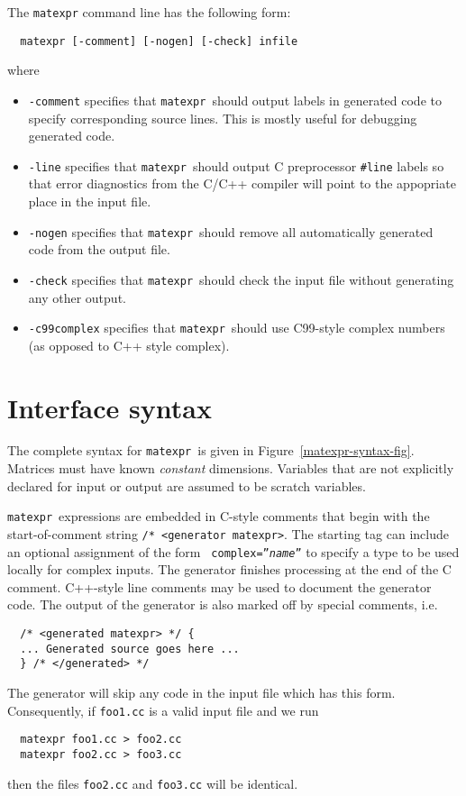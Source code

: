 \documentclass[12pt]{article}
\newcommand{\matexpr}{\texttt{matexpr}}
\begin{document}
The {\tt matexpr} command line has the following form:
\begin{verbatim}
  matexpr [-comment] [-nogen] [-check] infile
\end{verbatim}
where
\begin{itemize}

\item {\tt -comment} specifies that \matexpr\ should output
  labels in generated code to specify corresponding source lines.
  This is mostly useful for debugging generated code.

\item {\tt -line} specifies that \matexpr\ should output C preprocessor
  \verb|#line| labels so that error diagnostics from the C/C++ compiler
  will point to the appopriate place in the input file.

\item {\tt -nogen} specifies that \matexpr\ should remove all
  automatically generated code from the output file.

\item {\tt -check} specifies that \matexpr\ should check the
  input file without generating any other output.

\item {\tt -c99complex} specifies that \matexpr\ should use C99-style
  complex numbers (as opposed to C++ style complex).

\end{itemize}


\section{Interface syntax}

The complete syntax for \matexpr\ is given in Figure~\ref{matexpr-syntax-fig}. 
Matrices must have known {\em constant} dimensions.  Variables that are
not explicitly declared for input or output are assumed to be scratch
variables.

\matexpr\ expressions are embedded in C-style comments that begin with
the start-of-comment string {\tt /* <generator matexpr>}.  The
starting tag can include an optional assignment of the form {\tt
  complex=''{\it name}''} to specify a type to be used locally for
complex inputs.  The generator finishes processing at the end of the C
comment.  C++-style line comments may be used to document the
generator code.  The output of the generator is also marked off by
special comments, i.e.
\begin{verbatim}
  /* <generated matexpr> */ {
  ... Generated source goes here ...
  } /* </generated> */
\end{verbatim}
The generator will skip any code in the input file which has this form.
Consequently, if {\tt foo1.cc} is a valid input file and we run
\begin{verbatim}
  matexpr foo1.cc > foo2.cc
  matexpr foo2.cc > foo3.cc
\end{verbatim}
then the files {\tt foo2.cc} and {\tt foo3.cc} will be identical.
\end{document}
